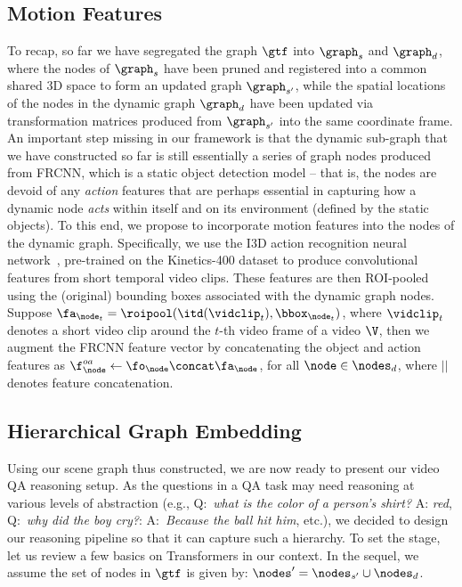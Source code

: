 \documentclass[letterpaper]{article} %
\begin{document}
\subsection{Motion Features}
To recap, so far we have segregated the graph $\gtf$ into $\graph_s$ and $\graph_d$, where the nodes of $\graph_s$ have been pruned and registered into a common shared 3D space to form an updated graph $\graph_{s'}$, while the spatial locations of the nodes in the dynamic graph $\graph_d$ have been updated via transformation matrices produced from $\graph_{s'}$ into the same coordinate frame. An important step missing in our framework is that the dynamic sub-graph that we have constructed so far is still essentially a series of graph nodes produced from FRCNN, which is a static object detection model -- that is, the nodes are devoid of any \emph{action} features that are perhaps essential in capturing how a dynamic node \emph{acts} within itself and on its environment (defined by the static objects). To this end, we propose to incorporate motion features into the nodes of the dynamic graph. Specifically, we use the I3D action recognition neural network~\cite{carreira2017quo}, pre-trained on the Kinetics-400 dataset to produce convolutional features from short temporal video clips. These features are then ROI-pooled using the (original) bounding boxes associated with the dynamic graph nodes. Suppose $\fa_{\node_t}=\roipool(\itd(\vidclip_t), \bbox_{\node_t})$, where $\vidclip_t$ denotes a short video clip around the $t$-th video frame of a video $\V$, then we augment the FRCNN feature vector by concatenating the object and action features as $\f^{oa}_\node \leftarrow \fo_\node \concat \fa_\node$, for all $\node\in\nodes_d$, where $||$ denotes feature concatenation.

\subsection{Hierarchical Graph Embedding}
Using our \name scene graph thus constructed, we are now ready to present our video QA reasoning setup. As the questions in a QA task may need reasoning at various levels of abstraction (e.g., Q:~\emph{what is the color of a person's shirt?} A: \emph{red}, Q:~\emph{why did the boy cry?}: A:~\emph{Because the ball hit him}, etc.), we decided to design our reasoning pipeline so that it can capture such a hierarchy. To set the stage, let us review a few basics on Transformers in our context. In the sequel, we assume the set of nodes in $\gtf$ is given by: $\nodes'=\nodes_{s'}\cup \nodes_d$.
\end{document}
